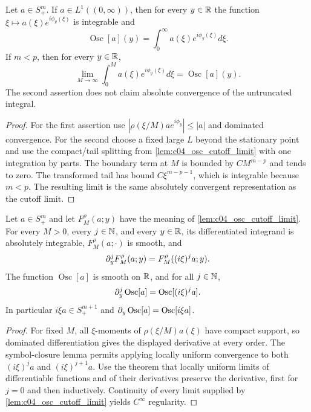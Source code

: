 \begin{lemma}
  \label{lem:c04_osc_ordinary_integrals}
  Let $a\in S^m_+$. If $a\in L^1((0,\infty))$, then for every $y\in\mathbb{R}$ the
  function $\xi\mapsto a(\xi)e^{i\phi_y(\xi)}$ is integrable and
  \[
    \operatorname{Osc}[a](y)=\int_0^\infty a(\xi)e^{i\phi_y(\xi)}d\xi.
  \]
  If $m<p$, then for every $y\in\mathbb{R}$,
  \[
    \lim_{M\to\infty}\int_0^M a(\xi)e^{i\phi_y(\xi)}d\xi=\operatorname{Osc}[a](y).
  \]
  The second assertion does not claim absolute convergence of the untruncated integral.
\end{lemma}
\begin{proof}
  For the first assertion use $|\rho(\xi/M)ae^{i\phi_y}|\le|a|$ and dominated convergence.
  For the second choose a fixed large $L$ beyond the stationary point and use the
  compact/tail splitting from \cref{lem:c04_osc_cutoff_limit} with one integration by parts.
  The boundary term at $M$ is bounded by $CM^{m-p}$ and tends to zero.
  The transformed tail has bound $C\xi^{m-p-1}$, which is integrable because $m<p$.
  The resulting limit is the same absolutely convergent representation as the cutoff limit.
\end{proof}

\begin{lemma}
  \label{lem:c04_osc_parameter_derivatives}
  Let $a\in S^m_+$ and let $F_M^\rho(a;y)$ have the meaning of
  \cref{lem:c04_osc_cutoff_limit}. For every $M>0$, every $j\in\mathbb{N}$, and every $y\in\mathbb{R}$,
  its differentiated integrand is absolutely integrable, $F_M^\rho(a;\cdot)$ is smooth, and
  \[
    \partial_y^jF_M^\rho(a;y)=F_M^\rho((i\xi)^ja;y).
  \]
  The function $\operatorname{Osc}[a]$ is smooth on $\mathbb{R}$, and for all $j\in\mathbb{N}$,
  \[
    \partial_y^j\operatorname{Osc}[a]=\operatorname{Osc}[(i\xi)^ja].
  \]
  In particular $i\xi a\in S^{m+1}_+$ and
  $\partial_y\operatorname{Osc}[a]=\operatorname{Osc}[i\xi a]$.
\end{lemma}
\begin{proof}
  For fixed $M$, all $\xi$-moments of $\rho(\xi/M)a(\xi)$ have compact support,
  so dominated differentiation gives the displayed derivative at every order.
  The symbol-closure lemma permits applying locally uniform convergence to both
  $(i\xi)^ja$ and $(i\xi)^{j+1}a$.
  Use the theorem that locally uniform limits of differentiable functions and of their
  derivatives preserve the derivative, first for $j=0$ and then inductively.
  Continuity of every limit supplied by \cref{lem:c04_osc_cutoff_limit} yields $C^\infty$ regularity.
\end{proof}


